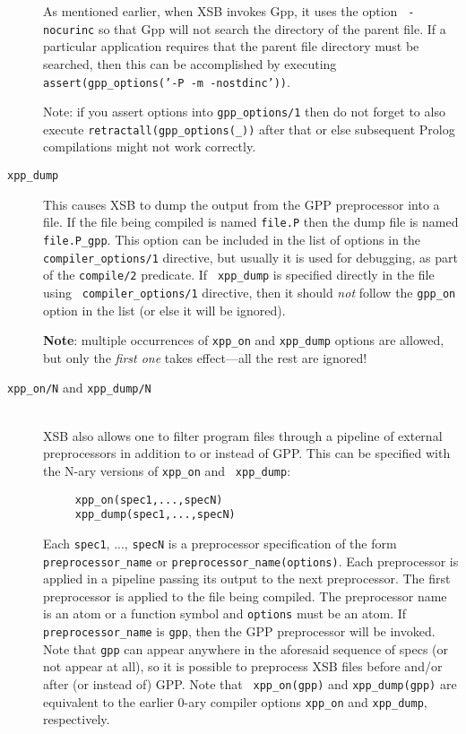 \begin{description}
  As mentioned earlier, when XSB invokes Gpp, it uses the option {\tt
    -nocurinc} so that Gpp will not search the directory of the parent file. 
  If a particular application requires that the parent file directory
  must be searched, then this can be accomplished by executing 
  {\tt assert(gpp\_options('-P -m -nostdinc'))}.
  
  Note: if you assert options into \texttt{gpp\_options/1} then do not
  forget to
  also execute \texttt{retractall(gpp\_options(\_))} after that or else
  subsequent Prolog compilations might not work correctly.
  
\item[{\tt xpp\_dump}] 
  This causes XSB to dump the output from the GPP preprocessor into a file.
  If the file being compiled is named {\tt file.P} then the dump file is
  named {\tt file.P\_gpp}. This option can be included in the list of
  options in the {\tt compiler\_options/1} directive, but usually it is
  used for debugging, as part of the {\tt compile/2} predicate. If {\tt
    xpp\_dump} is specified directly in the file using {\tt
    compiler\_options/1} directive, then it should \emph{not} follow the
  {\tt gpp\_on} option in the list (or else it will be ignored).

  {\bf Note}: multiple occurrences of {\tt xpp\_on} and {\tt xpp\_dump}
  options are allowed, but only the \emph{first one} takes effect---all the
  rest are ignored!  


\item[{\tt xpp\_on/N} and {\tt xpp\_dump/N}]
  ~\\
  XSB also allows one to filter program files through a pipeline of external
  preprocessors in addition to or instead of GPP.
  This can be specified with the N-ary versions of {\tt xpp\_on} and {\tt
    xpp\_dump}:
\begin{verbatim}
     xpp_on(spec1,...,specN)  
     xpp_dump(spec1,...,specN)  
\end{verbatim}
  Each {\tt spec1}, ..., {\tt specN} is a preprocessor specification of
  the form {\tt preprocessor\_name} or {\tt preprocessor\_name(options)}.
  Each preprocessor is applied in a pipeline passing its output to the next
  preprocessor. The first preprocessor is applied to the file being
  compiled.
  The preprocessor name is an atom or a function symbol and {\tt options}
  must be an atom. If {\tt preprocessor\_name} is {\tt gpp}, then the GPP
  preprocessor will be invoked. Note that {\tt gpp} can appear anywhere in
  the aforesaid sequence of specs (or not appear at all), so it is possible to preprocess
  XSB files before and/or after (or instead of) GPP. Note that {\tt
    xpp\_on(gpp)}  and {\tt xpp\_dump(gpp)} are equivalent to the earlier
  0-ary compiler options {\tt xpp\_on}
  and {\tt xpp\_dump}, respectively. 


\end{description}
